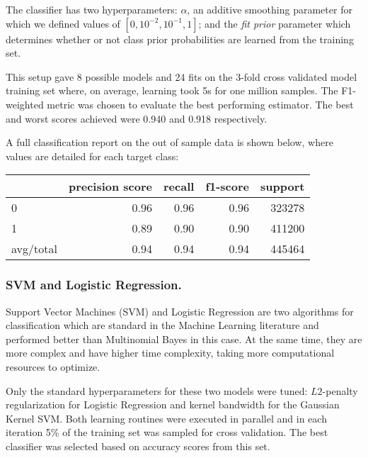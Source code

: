 The classifier has two hyperparameters: $\alpha$, an additive smoothing parameter for which we defined values of $[0,{10^{-2}},{10^{-1}},1]$; and the \textit{fit prior} parameter which determines whether or not class prior probabilities are learned from the training set. 

This setup gave 8 possible models and 24 fits on the 3-fold cross validated model training set where, on average, learning took 5s for one million samples. The F1-weighted metric was chosen to evaluate the best performing estimator.
The best and worst scores achieved were 0.940 and 0.918 respectively. 

A full classification report on the out of sample data is shown below, where values are detailed for each target class:
\begin{table}[ht]
	\label{tab:classification_report}
	\centering
	\begin{tabular}{ l r r r r }
		\toprule
		{ } & precision score & recall & f1-score & support \\
		\midrule
		0 		 & 0.96 & 0.96 & 0.96 & 323278 \\
		1		 & 0.89 & 0.90 & 0.90 & 411200 \\
		avg/total & 0.94 & 0.94 & 0.94 & 445464 \\
		\bottomrule
	\end{tabular}
\end{table}


\subsubsection{SVM and Logistic Regression.}

Support Vector Machines (SVM) and Logistic Regression are two algorithms for classification which are standard in the Machine Learning literature and performed better than Multinomial Bayes in this case. 
At the same time, they are more complex and have higher time complexity, taking more computational resources to optimize.

Only the standard hyperparameters for these two models were tuned: $L2$-penalty regularization for Logistic Regression and kernel bandwidth for the Gaussian Kernel SVM.
Both learning routines were executed in parallel and in each iteration 5\% of the training set was sampled for cross validation. The best classifier was selected based on accuracy scores from this set.

